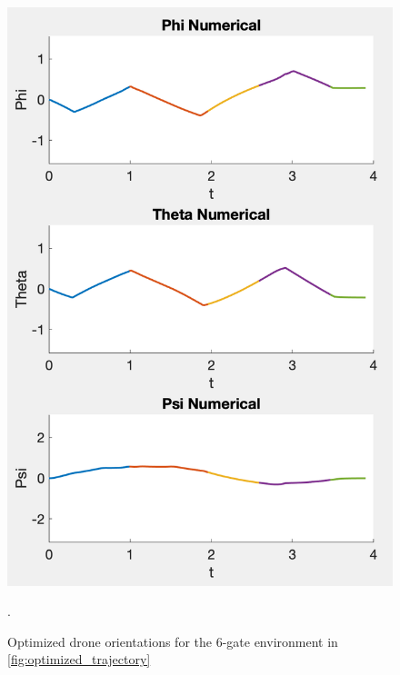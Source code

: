 \begin{figure}[htbp]
  \centering
  \includegraphics[width=1.0\columnwidth]{img/orientation.png}
  \caption{Optimized drone orientations for the 6-gate environment in \cref{fig:optimized_trajectory}}.
  \label{fig:optimized_orientation}
\end{figure}

